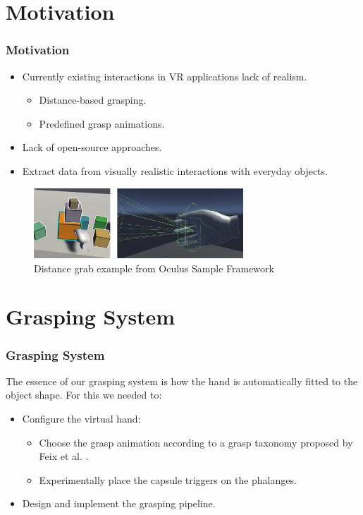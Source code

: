 \documentclass{beamer}
\theoremstyle{remark}
\theoremstyle{plain}
\begin{document}
\section{Motivation}

\begin{frame}
\frametitle{Motivation}
\begin{itemize}
	\item Currently existing interactions in VR applications lack of realism.
	\begin{itemize}
		\item Distance-based grasping.
		\item Predefined grasp animations.
	\end{itemize}
	\item Lack of open-source approaches.
	\item Extract data from visually realistic interactions with everyday objects.
\end{itemize}

\begin{figure}
	\centering
	\includegraphics[width=0.7\textwidth]{images/grab}
	\caption{Distance grab example from Oculus Sample Framework \cite{oculusGrab}}
\end{figure}
\end{frame}


\section{Grasping System}

\begin{frame}
\frametitle{Grasping System}
The essence of our grasping system is how the hand is automatically fitted to the object shape. For this we needed to:
\begin{itemize}
	\item Configure the virtual hand:
	\begin{itemize}
		\item Choose the grasp animation according to a grasp taxonomy proposed by Feix et al. \cite{feix}.
		\item Experimentally place the capsule triggers on the phalanges.
	\end{itemize}
	\item Design and implement the grasping pipeline.
\end{itemize}
\end{frame}
\end{document}
